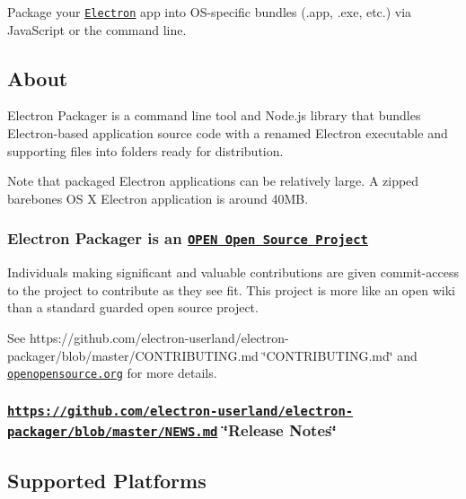Package your \href{http://electron.atom.io}{\tt Electron} app into O\+S-\/specific bundles ({\ttfamily .app}, {\ttfamily .exe}, etc.) via Java\+Script or the command line.

\href{https://travis-ci.org/electron-userland/electron-packager}{\tt } \href{https://ci.appveyor.com/project/electron-userland/electron-packager}{\tt } \href{https://coveralls.io/github/electron-userland/electron-packager?branch=master}{\tt } \href{https://dependencyci.com/github/electron-userland/electron-packager}{\tt }

\subsection*{About}

Electron Packager is a command line tool and Node.\+js library that bundles Electron-\/based application source code with a renamed Electron executable and supporting files into folders ready for distribution.

Note that packaged Electron applications can be relatively large. A zipped barebones OS X Electron application is around 40\+MB.

\subsubsection*{Electron Packager is an \href{http://openopensource.org/}{\tt O\+P\+EN Open Source Project}}

Individuals making significant and valuable contributions are given commit-\/access to the project to contribute as they see fit. This project is more like an open wiki than a standard guarded open source project.

See https\+://github.com/electron-\/userland/electron-\/packager/blob/master/\+C\+O\+N\+T\+R\+I\+B\+U\+T\+I\+N\+G.\+md \char`\"{}\+C\+O\+N\+T\+R\+I\+B\+U\+T\+I\+N\+G.\+md\char`\"{} and \href{http://openopensource.org/}{\tt openopensource.\+org} for more details.

\subsubsection*{\href{https://github.com/electron-userland/electron-packager/blob/master/NEWS.md}{\tt https\+://github.\+com/electron-\/userland/electron-\/packager/blob/master/\+N\+E\+W\+S.\+md} \char`\"{}\+Release Notes\char`\"{}}

\subsection*{Supported Platforms}

